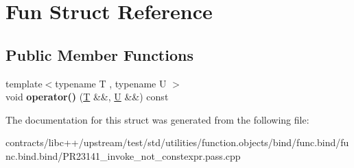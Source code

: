 \hypertarget{struct_fun}{}\section{Fun Struct Reference}
\label{struct_fun}
\subsection*{Public Member Functions}
\begin{DoxyCompactItemize}
\item 
\mbox{\label{struct_fun_ae880ccdea96a5b2e59141b197954fc5e}} 
{\footnotesize template$<$typename T , typename U $>$ }\\void {\bfseries operator()} (\mbox{\hyperlink{struct_t}{T}} \&\&, \mbox{\hyperlink{union_u}{U}} \&\&) const
\end{DoxyCompactItemize}


The documentation for this struct was generated from the following file\+:\begin{DoxyCompactItemize}
\item 
contracts/libc++/upstream/test/std/utilities/function.\+objects/bind/func.\+bind/func.\+bind.\+bind/P\+R23141\+\_\+invoke\+\_\+not\+\_\+constexpr.\+pass.\+cpp\end{DoxyCompactItemize}
